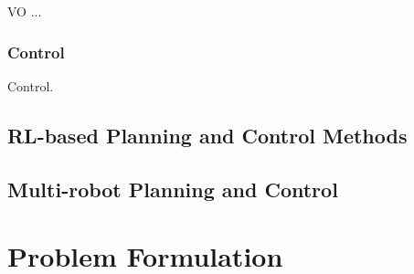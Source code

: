 \documentclass[letterpaper,journal,twoside]{IEEEtran}
\begin{document}
VO ...

\subsubsection{Control}
Control.

\subsection{RL-based Planning and Control Methods}

\subsection{Multi-robot Planning and Control}

\section{Problem Formulation}



\end{document}

